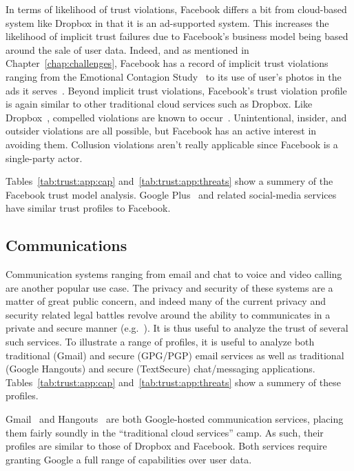 In terms of likelihood of trust violations, Facebook differs a bit
from cloud-based system like Dropbox in that it is an ad-supported
system. This increases the likelihood of implicit trust failures due
to Facebook's business model being based around the sale of user
data. Indeed, and as mentioned in Chapter~\ref{chap:challenges},
Facebook has a record of implicit trust violations ranging from the
Emotional Contagion Study~\cite{goel2014} to its use of user's photos
in the ads it serves~\cite{mashable-socialads}. Beyond implicit trust
violations, Facebook's trust violation profile is again similar to
other traditional cloud services such as Dropbox. Like
Dropbox~\cite{dropbox-transparency}, compelled violations are known to
occur~\cite{facebook-transparency}. Unintentional, insider, and
outsider violations are all possible, but Facebook has an active
interest in avoiding them. Collusion violations aren't really
applicable since Facebook is a single-party actor.

Tables~\ref{tab:trust:app:cap} and~\ref{tab:trust:app:threats} show a
summery of the Facebook trust model analysis. Google
Plus~\cite{google-plus} and related social-media services have similar
trust profiles to Facebook.

\subsection{Communications}

Communication systems ranging from email and chat to voice and video
calling are another popular use case. The privacy and security of
these systems are a matter of great public concern, and indeed many of
the current privacy and security related legal battles revolve around
the ability to communicates in a private and secure manner
(e.g.~\cite{apple-fbiletter, greenwald-prism, levsion-lavabit}). It is
thus useful to analyze the trust of several such services. To
illustrate a range of profiles, it is useful to analyze both
traditional (Gmail) and secure (GPG/PGP) email services as well as
traditional (Google Hangouts) and secure (TextSecure) chat/messaging
applications. Tables~\ref{tab:trust:app:cap}
and~\ref{tab:trust:app:threats} show a summery of these profiles.

Gmail~\cite{google-gmail} and Hangouts~\cite{google-hangouts} are both
Google-hosted communication services, placing them fairly soundly in
the ``traditional cloud services'' camp. As such, their profiles are
similar to those of Dropbox and Facebook. Both services require
granting Google a full range of capabilities over user data.

